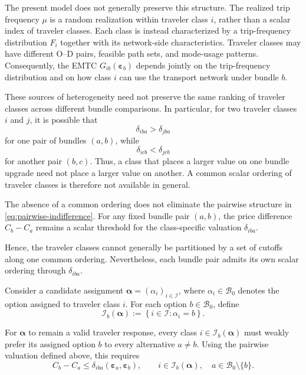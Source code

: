 \documentclass{article}
\begin{document}
The present model does not generally preserve this structure. The
realized trip frequency $\mu$ is a random realization within traveler
class $i$, rather than a scalar index of traveler classes. Each class is
instead characterized by a trip-frequency distribution $F_i$ together
with its network-side characteristics. Traveler classes may have
different O--D pairs, feasible path sets, and mode-usage patterns.
Consequently, the EMTC
$G_{ib}(\bm\varepsilon_b)$ depends jointly on the trip-frequency
distribution and on how class $i$ can use the transport network under
bundle $b$.

These sources of heterogeneity need not preserve the same ranking of
traveler classes across different bundle comparisons. In particular,
for two traveler classes $i$ and $j$, it is possible that
\begin{equation}
    \delta_{iba}
    >
    \delta_{jba}
    \label{eq:valuation-ranking-first-pair}
\end{equation}
for one pair of bundles $(a,b)$, while
\begin{equation}
    \delta_{icb}
    <
    \delta_{jcb}
    \label{eq:valuation-ranking-second-pair}
\end{equation}
for another pair $(b,c)$. Thus, a class that places a larger value on
one bundle upgrade need not place a larger value on another. A common
scalar ordering of traveler classes is therefore not available in
general.

The absence of a common ordering does not eliminate the pairwise
structure in \eqref{eq:pairwise-indifference}. For any fixed bundle pair
$(a,b)$, the price difference $C_b-C_a$ remains a scalar threshold for
the class-specific valuation $\delta_{iba}$. 

Hence, the traveler classes cannot generally be partitioned by a set of
cutoffs along one common ordering. Nevertheless, each bundle pair admits
its own scalar ordering through $\delta_{iba}$.

Consider a candidate assignment
$\bm\alpha=(\alpha_i)_{i\in\mathcal I}$, where
$\alpha_i\in\mathcal B_0$ denotes the option assigned to traveler class
$i$. For each option $b\in\mathcal B_0$, define
\begin{equation}
    \mathcal I_b(\bm\alpha)
    :=
    \left\{
        i\in\mathcal I:
        \alpha_i=b
    \right\}.
    \label{eq:assigned-traveler-set}
\end{equation}

For $\bm\alpha$ to remain a valid traveler response, every class
$i\in\mathcal I_b(\bm\alpha)$ must weakly prefer its assigned option
$b$ to every alternative $a\neq b$. Using the pairwise valuation
defined above, this requires
\begin{equation}
    C_b-C_a
    \leq
    \delta_{iba}(\bm\varepsilon_a,\bm\varepsilon_b),
    \qquad
    i\in\mathcal I_b(\bm\alpha),
    \quad
    a\in\mathcal B_0\setminus\{b\}.
    \label{eq:regional-choice-condition}
\end{equation}
\end{document}
